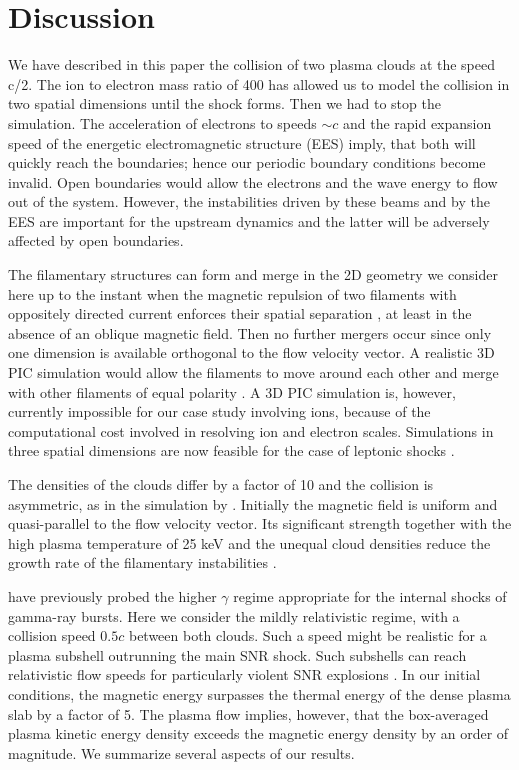 \documentclass[structabstract]{aa}
\begin{document}
\section{Discussion}

We have described in this paper the collision of two plasma clouds at the
speed c/2. The ion to electron mass ratio of 400 has allowed us to model 
the collision in two spatial dimensions until the shock forms. Then we had 
to stop the simulation. The acceleration of electrons to speeds $\sim c$ 
and the rapid expansion speed of the energetic electromagnetic structure 
(EES) imply, that both will quickly reach the boundaries; hence our periodic 
boundary conditions become invalid. Open boundaries would allow the electrons 
and the wave energy to flow out of the system. However, the instabilities 
driven by these beams \citep{Martins} and by the EES are important for the 
upstream dynamics and the latter will be adversely affected by open boundaries. 

The filamentary structures can form and merge in the 2D geometry we consider
here up to the instant when the magnetic repulsion of two filaments with 
oppositely directed current enforces their spatial separation 
\citep{Davidson,Lee}, at least in the absence of an oblique magnetic field. 
Then no further mergers occur since only one dimension is available 
orthogonal to the flow velocity vector. A realistic 3D PIC simulation would 
allow the filaments to move around each other and merge with other filaments 
of equal polarity \citep{Lee}. A 3D PIC simulation is, however, currently 
impossible for our case study involving ions, because of the computational 
cost involved in resolving ion and electron scales. Simulations in three 
spatial dimensions are now feasible for the case of leptonic shocks 
\citep{Nishi2}.

The densities of the clouds differ by a factor of 10 and the collision 
is asymmetric, as in the simulation by \citet{Oblique1,Oblique2,Sorasio}. 
Initially the magnetic field is uniform and quasi-parallel to the flow 
velocity vector. Its significant strength together with the high plasma 
temperature of 25 keV and the unequal cloud densities reduce the growth 
rate of the filamentary instabilities \citep{Mag,Bellido}. 

\citet{Shock1} have previously probed the higher $\gamma$ regime appropriate 
for the internal shocks of gamma-ray bursts. Here we consider the mildly 
relativistic regime, with a collision speed $0.5c$ between both clouds. 
Such a speed might be realistic for a plasma subshell outrunning the main SNR 
shock. Such subshells can reach relativistic flow speeds for particularly 
violent SNR explosions \citep{Shockspeed1}. In our initial conditions, the 
magnetic energy surpasses  the thermal energy of the dense plasma slab by 
a factor of 5. The plasma flow implies, however, that the box-averaged 
plasma kinetic energy density exceeds the magnetic energy density by an order 
of magnitude. We summarize several aspects of our results.
\end{document}
